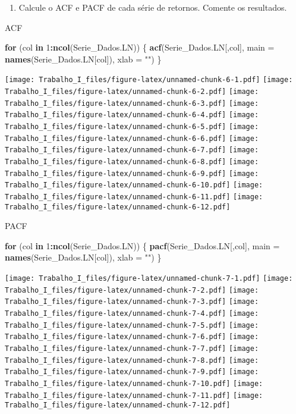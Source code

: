 \documentclass[]{article}
\newenvironment{Shaded}{\begin{snugshade}}{\end{snugshade}}
\newcommand{\KeywordTok}[1]{\textcolor[rgb]{0.13,0.29,0.53}{\textbf{#1}}}
\newcommand{\DataTypeTok}[1]{\textcolor[rgb]{0.13,0.29,0.53}{#1}}
\newcommand{\DecValTok}[1]{\textcolor[rgb]{0.00,0.00,0.81}{#1}}
\newcommand{\StringTok}[1]{\textcolor[rgb]{0.31,0.60,0.02}{#1}}
\newcommand{\ControlFlowTok}[1]{\textcolor[rgb]{0.13,0.29,0.53}{\textbf{#1}}}
\newcommand{\OperatorTok}[1]{\textcolor[rgb]{0.81,0.36,0.00}{\textbf{#1}}}
\newcommand{\NormalTok}[1]{#1}
\providecommand{\tightlist}{%
  \setlength{\itemsep}{0pt}\setlength{\parskip}{0pt}}
\begin{document}
\begin{enumerate}
\def\labelenumi{\alph{enumi})}
\setcounter{enumi}{2}
\tightlist
\item
  Calcule o ACF e PACF de cada série de retornos. Comente os resultados.
\end{enumerate}

ACF

\begin{Shaded}
\begin{Highlighting}[]
\ControlFlowTok{for}\NormalTok{ (col }\ControlFlowTok{in} \DecValTok{1}\OperatorTok{:}\KeywordTok{ncol}\NormalTok{(Serie_Dados.LN)) \{}
  \KeywordTok{acf}\NormalTok{(Serie_Dados.LN[,col], }\DataTypeTok{main =} \KeywordTok{names}\NormalTok{(Serie_Dados.LN[col]), }\DataTypeTok{xlab =} \StringTok{""}\NormalTok{)}
\NormalTok{\}}
\end{Highlighting}
\end{Shaded}

\texttt{[image: Trabalho\_I\_files/figure-latex/unnamed-chunk-6-1.pdf]}
\texttt{[image: Trabalho\_I\_files/figure-latex/unnamed-chunk-6-2.pdf]}
\texttt{[image: Trabalho\_I\_files/figure-latex/unnamed-chunk-6-3.pdf]}
\texttt{[image: Trabalho\_I\_files/figure-latex/unnamed-chunk-6-4.pdf]}
\texttt{[image: Trabalho\_I\_files/figure-latex/unnamed-chunk-6-5.pdf]}
\texttt{[image: Trabalho\_I\_files/figure-latex/unnamed-chunk-6-6.pdf]}
\texttt{[image: Trabalho\_I\_files/figure-latex/unnamed-chunk-6-7.pdf]}
\texttt{[image: Trabalho\_I\_files/figure-latex/unnamed-chunk-6-8.pdf]}
\texttt{[image: Trabalho\_I\_files/figure-latex/unnamed-chunk-6-9.pdf]}
\texttt{[image: Trabalho\_I\_files/figure-latex/unnamed-chunk-6-10.pdf]}
\texttt{[image: Trabalho\_I\_files/figure-latex/unnamed-chunk-6-11.pdf]}
\texttt{[image: Trabalho\_I\_files/figure-latex/unnamed-chunk-6-12.pdf]}

PACF

\begin{Shaded}
\begin{Highlighting}[]
\ControlFlowTok{for}\NormalTok{ (col }\ControlFlowTok{in} \DecValTok{1}\OperatorTok{:}\KeywordTok{ncol}\NormalTok{(Serie_Dados.LN)) \{}
  \KeywordTok{pacf}\NormalTok{(Serie_Dados.LN[,col], }\DataTypeTok{main =} \KeywordTok{names}\NormalTok{(Serie_Dados.LN[col]), }\DataTypeTok{xlab =} \StringTok{""}\NormalTok{)}
\NormalTok{\}}
\end{Highlighting}
\end{Shaded}

\texttt{[image: Trabalho\_I\_files/figure-latex/unnamed-chunk-7-1.pdf]}
\texttt{[image: Trabalho\_I\_files/figure-latex/unnamed-chunk-7-2.pdf]}
\texttt{[image: Trabalho\_I\_files/figure-latex/unnamed-chunk-7-3.pdf]}
\texttt{[image: Trabalho\_I\_files/figure-latex/unnamed-chunk-7-4.pdf]}
\texttt{[image: Trabalho\_I\_files/figure-latex/unnamed-chunk-7-5.pdf]}
\texttt{[image: Trabalho\_I\_files/figure-latex/unnamed-chunk-7-6.pdf]}
\texttt{[image: Trabalho\_I\_files/figure-latex/unnamed-chunk-7-7.pdf]}
\texttt{[image: Trabalho\_I\_files/figure-latex/unnamed-chunk-7-8.pdf]}
\texttt{[image: Trabalho\_I\_files/figure-latex/unnamed-chunk-7-9.pdf]}
\texttt{[image: Trabalho\_I\_files/figure-latex/unnamed-chunk-7-10.pdf]}
\texttt{[image: Trabalho\_I\_files/figure-latex/unnamed-chunk-7-11.pdf]}
\texttt{[image: Trabalho\_I\_files/figure-latex/unnamed-chunk-7-12.pdf]}
\end{document}
